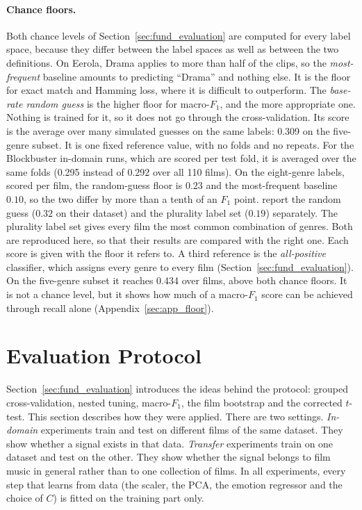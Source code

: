 \paragraph{Chance floors.} Both chance levels of Section~\ref{sec:fund_evaluation} are computed for every label space, because they differ between the label spaces as well as between the two definitions. On Eerola, Drama applies to more than half of the clips, so the \emph{most-frequent} baseline amounts to predicting ``Drama'' and nothing else. It is the floor for exact match and Hamming loss, where it is difficult to outperform. The \emph{base-rate random guess} is the higher floor for macro-$F_1$, and the more appropriate one. Nothing is trained for it, so it does not go through the cross-validation. Its score is the average over many simulated guesses on the same labels: 0.309 on the five-genre subset. It is one fixed reference value, with no folds and no repeats. For the Blockbuster in-domain runs, which are scored per test fold, it is averaged over the same folds (0.295 instead of 0.292 over all 110 films). On the eight-genre labels, scored per film, the random-guess floor is $0.23$ and the most-frequent baseline $0.10$, so the two differ by more than a tenth of an $F_1$ point. \citet{ma2021computational} report the random guess ($0.32$ on their dataset) and the plurality label set ($0.19$) separately. The plurality label set gives every film the most common combination of genres. Both are reproduced here, so that their results are compared with the right one. Each score is given with the floor it refers to. A third reference is the \emph{all-positive} classifier, which assigns every genre to every film (Section~\ref{sec:fund_evaluation}). On the five-genre subset it reaches 0.434 over films, above both chance floors. It is not a chance level, but it shows how much of a macro-$F_1$ score can be achieved through recall alone (Appendix~\ref{sec:app_floor}).

\section{Evaluation Protocol}
\label{sec:evaluation_protocol}

Section~\ref{sec:fund_evaluation} introduces the ideas behind the protocol: grouped cross-validation, nested tuning, macro-$F_1$, the film bootstrap and the corrected $t$-test. This section describes how they were applied. There are two settings. \emph{In-domain} experiments train and test on different films of the same dataset. They show whether a signal exists in that data. \emph{Transfer} experiments train on one dataset and test on the other. They show whether the signal belongs to film music in general rather than to one collection of films. In all experiments, every step that learns from data (the scaler, the PCA, the emotion regressor and the choice of $C$) is fitted on the training part only.

